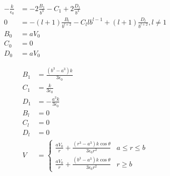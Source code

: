 \documentclass{article}
\begin{document}
\begin{enumerate}
\begin{align*}
          -\frac{k}{\epsilon_0}                                                                                                                 & = -2 \frac{B_1}{b^3} - C_1 + 2 \frac{D_1}{b^3}                                                                                         \\
          0                                                                                                                                     & = -(l + 1) \frac{B_l}{b^{l + 2}} - C_l l b^{l - 1} + (l + 1) \frac{D_l}{b^{l + 2}}, l \ne 1                                            \\
          B_0                                                                                                                                   & = a V_0                                                                                                                                \\
          C_0                                                                                                                                   & = 0                                                                                                                                    \\
          D_0                                                                                                                                   & = a V_0
        \end{align*}

        \begin{align*}
          B_1 & = \frac{(b^3 - a^3) k}{3 \epsilon_0}                                                   \\
          C_1 & = \frac{k}{3 \epsilon_0}                                                               \\
          D_1 & = -\frac{a^3 k}{3 \epsilon_0}                                                          \\
          B_l & = 0                                                                                    \\
          C_l & = 0                                                                                    \\
          D_l & = 0                                                                                    \\
          V   & = \begin{cases}
                    \frac{a V_0}{r} + \frac{(r^3 - a^3) k \cos \theta}{3 \epsilon_0 r^2} & a \le r \le b \\
                    \frac{a V_0}{r} + \frac{(b^3 - a^3) k \cos \theta}{3 \epsilon_0 r^2} & r \ge b
                  \end{cases}
        \end{align*}


\end{enumerate}
\end{document}
